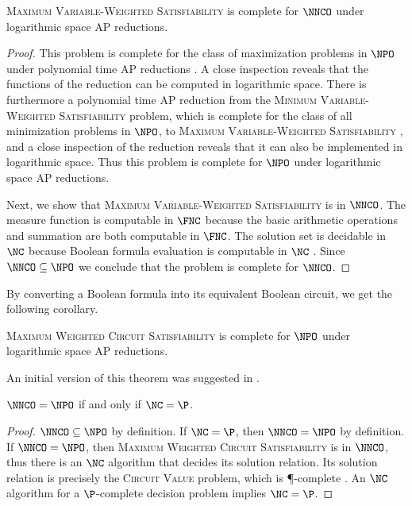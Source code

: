 \begin{theorem}
  \textsc{Maximum Variable-Weighted Satisfiability} is complete for $\NNCO$ under logarithmic space AP reductions.
\end{theorem}
\begin{proof}
  This problem is complete for the class of maximization problems in $\NPO$ under polynomial time AP reductions \cite[Theorem~3.1]{om87}.
  A close inspection reveals that the functions of the reduction can be computed in logarithmic space.
  There is furthermore a polynomial time AP reduction from the \textsc{Minimum Variable-Weighted Satisfiability} problem, which is complete for the class of all minimization problems in $\NPO$, to \textsc{Maximum Variable-Weighted Satisfiability} \cite[Theorem~8.4]{acgkmp99}, and a close inspection of the reduction reveals that it can also be implemented in logarithmic space.
  Thus this problem is complete for $\NPO$ under logarithmic space AP reductions.

  Next, we show that \textsc{Maximum Variable-Weighted Satisfiability} is in $\NNCO$.
  The measure function is computable in $\FNC$ because the basic arithmetic operations and summation are both computable in $\FNC$.
  The solution set is decidable in $\NC$ because Boolean formula evaluation is computable in $\NC$ \cite{buss87}.
  Since $\NNCO \subseteq \NPO$ we conclude that the problem is complete for $\NNCO$.
\end{proof}

By converting a Boolean formula into its equivalent Boolean circuit, we get the following corollary.

\begin{corollary}
  \textsc{Maximum Weighted Circuit Satisfiability} is complete for $\NPO$ under logarithmic space AP reductions.
\end{corollary}

An initial version of this theorem was suggested in \autocite{haney13}.

\begin{theorem}\label{thm:nnconpo}
  $\NNCO = \NPO$ if and only if $\NC = \P$.
\end{theorem}
\begin{proof}
  $\NNCO \subseteq \NPO$ by definition.
  If $\NC = \P$, then $\NNCO = \NPO$ by definition.
  If $\NNCO = \NPO$, then \textsc{Maximum Weighted Circuit Satisfiability} is in $\NNCO$, thus there is an $\NC$ algorithm that decides its solution relation.
  Its solution relation is precisely the \textsc{Circuit Value} problem, which is \P-complete \cite[Problem~A.1.1]{ghr95}.
  An $\NC$ algorithm for a $\P$-complete decision problem implies $\NC = \P$.
\end{proof}


